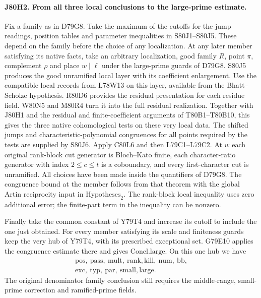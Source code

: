 \paragraph{J80H2. From all three local conclusions to the large-prime estimate.}
Fix a family as in D79G8. Take the maximum of the cutoffs for the
jump readings, position tables and parameter inequalities in S80J1--S80J5.
These depend on the family before the choice of any localization.
At any later member satisfying its native facts, take an arbitrary
localization, good family $R$, point $\pi$, complement $\rho$ and
place $w\mid\ell$ under the large-prime guards of D79G8. S80J5
produces the good unramified local layer with its coefficient
enlargement. Use the compatible local records from L78W13 on this
layer, available from the Bhatt--Scholze hypothesis. R80D6 provides
the residual presentation for each residue field. W80N5 and M80R4
turn it into the full residual realization. Together with J80H1 and
the residual and finite-coefficient arguments of T80B1--T80B10, this
gives the three native cohomological tests on these very local data.
The shifted jumps and characteristic-polynomial congruences for all
points required by the tests are supplied by S80J6. Apply C80L6
and then L79C1--L79C2. At $w$ each original rank-block cut generator
is Bloch--Kato finite, each character-ratio generator with index
$2\le c\le t$ is a coboundary, and every first-character cut is
unramified. All choices have been made inside the quantifiers of
D79G8. The congruence bound at the member follows from that theorem
with the global Artin reciprocity input in $\mathrm{Hypotheses}_2$.
The rank-block local inequality uses zero additional error; the
finite-part term in the inequality can be nonzero.

Finally take the common constant of Y79T4 and increase its cutoff
to include the one just obtained. For every member satisfying its
scale and finiteness guards keep the very hub of Y79T4, with its
prescribed exceptional set. G79E10 applies the congruence estimate
there and gives $\mathrm{Concl.large}$. On this one hub we have
\[
 \begin{gathered}
 \mathrm{pos},\ \mathrm{pass},\ \mathrm{mult},\ \mathrm{rank},
 \mathrm{kill},\ \mathrm{num},\ \mathrm{bb},\\
 \mathrm{exc},\ \mathrm{typ},\ \mathrm{par},\ \mathrm{small},
 \mathrm{large}.
 \end{gathered}
\]
The original denominator family conclusion still requires the
middle-range, small-prime correction and ramified-prime fields.
